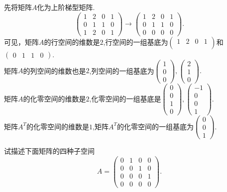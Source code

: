 ﻿\documentclass{book} \usepackage{exsheets} \usepackage{xeCJK}
\begin{document}
\begin{solution}
  先将矩阵$A$化为上阶梯型矩阵.
$$
\begin{pmatrix}
  1&2&0&1\\
  0&1&1&0\\
  1&2&0&1
\end{pmatrix}\to
\begin{pmatrix}
  1&2&0&1\\
  0&1&1&0\\
  0&0&0&0
\end{pmatrix}.
$$
可见，矩阵$A$的行空间的维数是$2$,行空间的一组基底为$
\begin{pmatrix}
  1&2&0&1\\
\end{pmatrix}
$和$
\begin{pmatrix}
  0&1&1&0
\end{pmatrix}
$.\\

矩阵$A$的列空间的维数也是$2$,列空间的一组基底为$
\begin{pmatrix}
  1\\
  0\\
  0
\end{pmatrix},
\begin{pmatrix}
  2\\
  1\\
  0
\end{pmatrix}.
$\\

矩阵$A$的化零空间的维数是$2$,化零空间的一组基底是$
\begin{pmatrix}
  0\\
  0\\
  1\\
  0
\end{pmatrix},
\begin{pmatrix}
  -1\\
  0\\
  0\\
  1
\end{pmatrix}.
$\\

矩阵$A^T$的化零空间的维数是$1$,矩阵$A^T$的化零空间的一组基底为$
\begin{pmatrix}
  0\\
  0\\
  1
\end{pmatrix}.$
\end{solution}
\begin{question}
  试描述下面矩阵的四种子空间
$$
A=
\begin{pmatrix}
  0&1&0&0\\
  0&0&1&0\\
  0&0&0&1\\
  0&0&0&0
\end{pmatrix}.
$$
\end{question}
\end{document}

